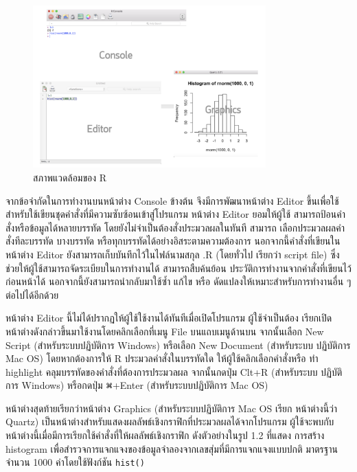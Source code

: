 \documentclass[
  a4paper,
]{book}
\begin{document}
\begin{figure}

\begin{minipage}{\linewidth}

\includegraphics[width=0.8\textwidth,height=\textheight]{img/01_Renvironment.png}

\end{minipage}%

\caption{\label{fig-REnvironment}สภาพแวดล้อมของ R}

\end{figure}%

จากข้อจำกัดในการทำงานบนหน้าต่าง Console ข้างต้น จึงมีการพัฒนาหน้าต่าง Editor
ขึ้นเพื่อใช้สำหรับใช้เขียนชุดคำสั่งที่มีความซับซ้อนเข้าสู่โปรแกรม หน้าต่าง Editor ยอมให้ผู้ใช้
สามารถป้อนคำสั่งหรือข้อมูลได้หลายบรรทัด โดยยังไม่จำเป็นต้องสั่งประมวลผลในทันที สามารถ
เลือกประมวลผลคำสั่งทีละบรรทัด บางบรรทัด หรือทุกบรรทัดได้อย่างอิสระตามความต้องการ
นอกจากนี้คำสั่งที่เขียนในหน้าต่าง Editor ยังสามารถเก็บบันทึกไว้ในไฟล์นามสกุล .R (โดยทั่วไป
เรียกว่า script file) ซึ่งช่วยให้ผู้ใช้สามารถจัดระเบียบในการทำงานได้ สามารถสืบค้นย้อน
ประวัติการทำงานจากคำสั่งที่เขียนไว้ก่อนหน้าได้ นอกจากนี้ยังสามารถนำกลับมาใช้ซ้ำ แก้ไข หรือ
ดัดแปลงให้เหมาะสำหรับการทำงานอื่น ๆ ต่อไปได้อีกด้วย

หน้าต่าง Editor นี้ไม่ได้ปรากฏให้ผู้ใช้ใช้งานได้ทันทีเมื่อเปิดโปรแกรม ผู้ใช้จำเป็นต้อง
เรียกเปิดหน้าต่างดังกล่าวขึ้นมาใช้งานโดยคลิกเลือกที่เมนู File บนแถบเมนูด้านบน จากนั้นเลือก
New Script (สำหรับระบบปฏิบัติการ Windows) หรือเลือก New Document (สำหรับระบบ
ปฏิบัติการ Mac OS) โดยหากต้องการให้ R ประมวลคำสั่งในบรรทัดใด ให้ผู้ใช้คลิกเลือกคำสั่งหรือ
ทำ highlight คลุมบรรทัดของคำสั่งที่ต้องการประมวลผล จากนั้นกดปุ่ม Clt+R (สำหรับระบบ
ปฏิบัติการ Windows) หรือกดปุ่ม ⌘+Enter (สำหรับระบบปฏิบัติการ Mac OS)

หน้าต่างสุดท้ายเรียกว่าหน้าต่าง Graphics (สำหรับระบบปฏิบัติการ Mac OS เรียก หน้าต่างนี้ว่า
Quartz) เป็นหน้าต่างสำหรับแสดงผลลัพธ์เชิงกราฟิกที่ประมวลผลได้จากโปรแกรม
ผู้ใช้จะพบกับหน้าต่างนี้เมื่อมีการเรียกใช้คำสั่งที่ให้ผลลัพธ์เชิงกราฟิก ดังตัวอย่างในรูป 1.2 ที่แสดง
การสร้าง histogram เพื่อสำรวจการแจกแจงของข้อมูลจำลองจากเลขสุ่มที่มีการแจกแจงแบบปกติ
มาตรฐานจำนวน 1000 ค่าโดยใช้ฟังก์ชัน \texttt{hist()}
\end{document}
